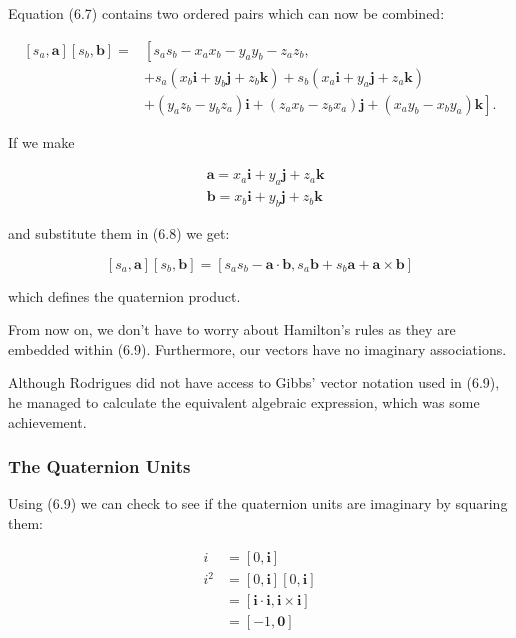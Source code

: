 \documentclass[10pt]{article}
\begin{document}
Equation (6.7) contains two ordered pairs which can now be combined:

$$
\begin{aligned}
{\left[s_{a}, \mathbf{a}\right]\left[s_{b}, \mathbf{b}\right]=} & {\left[s_{a} s_{b}-x_{a} x_{b}-y_{a} y_{b}-z_{a} z_{b},\right.} \\
& +s_{a}\left(x_{b} \mathbf{i}+y_{b} \mathbf{j}+z_{b} \mathbf{k}\right)+s_{b}\left(x_{a} \mathbf{i}+y_{a} \mathbf{j}+z_{a} \mathbf{k}\right) \\
& \left.+\left(y_{a} z_{b}-y_{b} z_{a}\right) \mathbf{i}+\left(z_{a} x_{b}-z_{b} x_{a}\right) \mathbf{j}+\left(x_{a} y_{b}-x_{b} y_{a}\right) \mathbf{k}\right] .
\end{aligned}
$$

If we make

$$
\begin{aligned}
& \mathbf{a}=x_{a} \mathbf{i}+y_{a} \mathbf{j}+z_{a} \mathbf{k} \\
& \mathbf{b}=x_{b} \mathbf{i}+y_{b} \mathbf{j}+z_{b} \mathbf{k}
\end{aligned}
$$

and substitute them in (6.8) we get:

$$
\left[s_{a}, \mathbf{a}\right]\left[s_{b}, \mathbf{b}\right]=\left[s_{a} s_{b}-\mathbf{a} \cdot \mathbf{b}, s_{a} \mathbf{b}+s_{b} \mathbf{a}+\mathbf{a} \times \mathbf{b}\right]
$$

which defines the quaternion product.

From now on, we don't have to worry about Hamilton's rules as they are embedded within (6.9). Furthermore, our vectors have no imaginary associations.

Although Rodrigues did not have access to Gibbs' vector notation used in (6.9), he managed to calculate the equivalent algebraic expression, which was some achievement.

\subsubsection{The Quaternion Units}
Using (6.9) we can check to see if the quaternion units are imaginary by squaring them:

$$
\begin{aligned}
i & =[0, \mathbf{i}] \\
i^{2} & =[0, \mathbf{i}][0, \mathbf{i}] \\
& =[\mathbf{i} \cdot \mathbf{i}, \mathbf{i} \times \mathbf{i}] \\
& =[-1, \mathbf{0}]
\end{aligned}
$$
\end{document}
